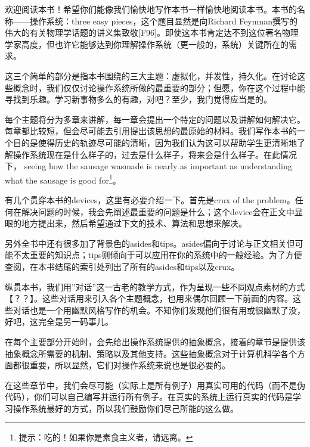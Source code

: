  \vspace*{0.0cm}
\thispagestyle{empty}
\centerline{}\vspace{2cm}

欢迎阅读本书！希望你们能像我们愉快地写作本书一样愉快地阅读本书。本书的名称——操作系统：three easy pieces，这个题目显然是向Richard Feynman撰写的伟大的有关物理学话题的讲义集致敬[F96]。即使这本书肯定达不到这位著名物理学家高度，但也许它能够达到你理解操作系统（更一般的，系统）关键所在的需求。

这三个简单的部分是指本书围绕的三大主题：虚拟化，并发性，持久化。在讨论这些概念时，我们仅仅讨论操作系统所做的最重要的部分；但愿，你在这个过程中能寻找到乐趣。学习新事物多么的有趣，对吧？至少，我门觉得应当是的。

每个主题将分为多章来讲解，每一章会提出一个特定的问题以及讲解如何解决它。每章都比较短，但会尽可能去引用提出该思想的最原始的材料。我们写作本书的一个目的是使得历史的轨迹尽可能的清晰，因为我们认为这可以帮助学生更清晰地了解操作系统现在是什么样子的，过去是什么样子，将来会是什么样子。在此情况下， seeing how the sausage wasmade is nearly as important as understanding what the sausage is good for\footnote{提示：吃的！如果你是素食主义者，请远离。}。

有几个贯穿本书的devices，这里有必要介绍一下。首先是crux of the problem。任何在解决问题的时候，我会先阐述最重要的问题是什么；这个device会在正文中显眼的地方提出来，然后希望通过下文的技术、算法和思想来解决。

另外全书中还有很多加了背景色的asides和tips。asides偏向于讨论与正文相关但可能不太重要的知识点；tips则倾向于可以应用在你的系统中的一般经验。为了方便查阅，在本书结尾的索引处列出了所有的asides和tips以及crux。

纵贯本书，我们用”对话”这一古老的教学方式，作为呈现一些不同观点素材的方式【？？】。这些对话用来引入各个主题概念，也用来偶尔回顾一下前面的内容。这些对话也是一个用幽默风格写作的机会。不知你们发现他们很有用或很幽默了没，好吧，这完全是另一码事儿。

在每个主要部分开始时，会先给出操作系统提供的抽象概念，接着的章节是提供该抽象概念所需要的机制、策略以及其他支持。这些抽象概念对于计算机科学各个方面都很重要，所以显然，它们对操作系统来说也是很必要的。

在这些章节中，我们会尽可能（实际上是所有例子）用真实可用的代码（而不是伪代码），你们可以自己编写并运行所有例子。在真实的系统上运行真实的代码是学习操作系统最好的方式，所以我们鼓励你们尽己所能的这么做。

